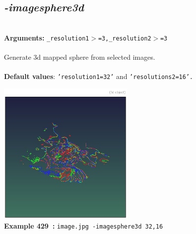 \documentclass[a4paper,11pt,twoside]{book}
\begin{document}
\subsection{\emph{-imagesphere3d} }\vspace*{-0.5em}
~\\\textbf{Arguments: } 
{\small \texttt{\_resolution1$>$=3,\_resolution2$>$=3}}\\~\\
Generate 3d mapped sphere from selected images.
~\\~\\\textbf{Default values}: {\small \texttt{'resolution1=32'} and \texttt{'resolutions2=16'.}}
\begin{center}\includegraphics[keepaspectratio=true,height=7cm,width=\textwidth]{img/gmic_def429.jpg}\\
{\footnotesize \textbf{Example 429~:} \texttt{image.jpg -imagesphere3d 32,16}}
\end{center}
\end{document}
